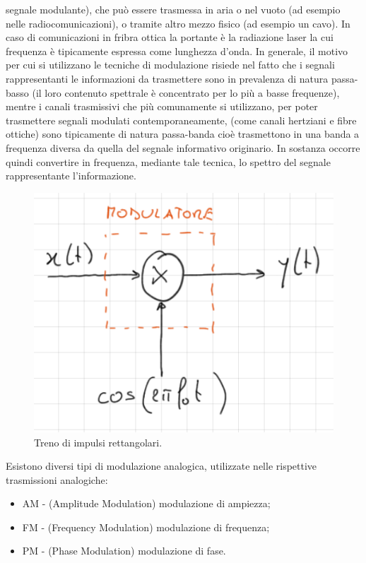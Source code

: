 \documentclass[12pt,oneside,openany]{memoir}
\numberwithin{equation}{subsection}
\begin{document}
segnale modulante), che pu\`o essere trasmessa in aria o nel vuoto (ad esempio
nelle radiocomunicazioni), o tramite altro mezzo fisico (ad esempio un cavo).
In caso di comunicazioni in fribra ottica la portante \`e la radiazione laser la
cui frequenza \`e tipicamente espressa come lunghezza d'onda.
\bigbreak
In generale, il motivo per cui si utilizzano le tecniche di modulazione risiede
nel fatto che i segnali rappresentanti le informazioni da trasmettere sono in
prevalenza di natura passa-basso (il loro contenuto spettrale \`e concentrato
per lo pi\`u a basse frequenze), mentre i canali trasmissivi che pi\`u
comunamente si utilizzano, per poter trasmettere segnali modulati
contemporaneamente, (come canali hertziani e fibre ottiche) sono tipicamente di
natura passa-banda cio\`e trasmettono in una banda a frequenza diversa da quella
del segnale informativo originario. In sostanza occorre quindi convertire in
frequenza, mediante tale tecnica, lo spettro del segnale rappresentante
l'informazione.
\begin{figure}[H]
	\centering
	\captionsetup{justification=centering}
	\includegraphics[width=1.0\textwidth]{images/modulatore.png}
	\caption{Treno di impulsi rettangolari.}
\end{figure}
Esistono diversi tipi di modulazione analogica, utilizzate nelle rispettive
trasmissioni analogiche:
\begin{itemize}
	\item AM - (Amplitude Modulation) modulazione di ampiezza;
	\item FM - (Frequency Modulation) modulazione di frequenza;
	\item PM - (Phase Modulation) modulazione di fase.
\end{itemize}
\end{document}
